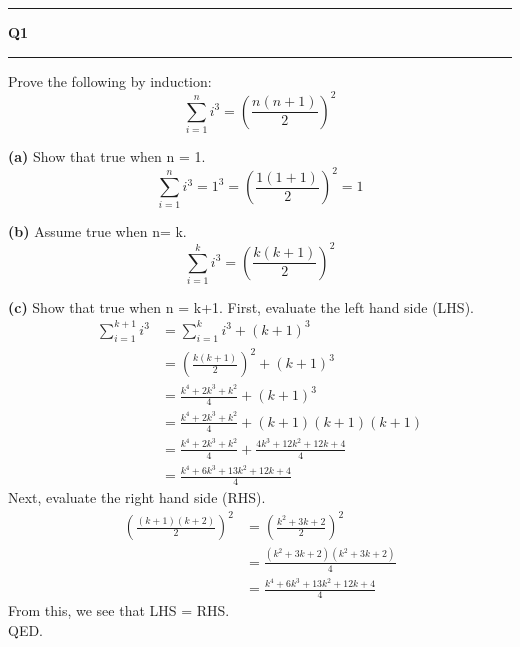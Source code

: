 \documentclass[11pt]{article}
\newcommand\question[2]{\vspace{.25in}\hrule\textbf{#1 #2}\vspace{.5em}\hrule\vspace{.10in}}
\renewcommand\part[1]{\vspace{.10in}\textbf{(#1)}}
\begin{document}
\raggedright
\newcommand\NAME{Sean Connor (443-414-5111)}  %
\newcommand\HWNUM{1}              %

\question{Q1}{}
Prove the following by induction:
\begin{equation*}
\sum_{i=1}^{n} i^3 = \left(\frac{n(n+1)}{2}\right)^2
\end{equation*}

\part{a} Show that true when n = 1.
\begin{equation*}
\sum_{i=1}^{n} i^3 = 1^3 = \left(\frac{1(1+1)}{2}\right)^2 = 1
\end{equation*}

\part{b} Assume true when n= k.
\begin{equation*}
\sum_{i=1}^{k} i^3 = \left(\frac{k(k+1)}{2}\right)^2
\end{equation*}

\part{c} Show that true when n = k+1.
\newline
\newline
First, evaluate the left hand side (LHS).
\begin{align*}
\sum_{i=1}^{k+1} i^3 & = \sum_{i=1}^{k} i^3 + (k+1)^3 \\
& = \left(\frac{k(k+1)}{2}\right)^2 + (k+1)^3 \\
& = \frac{k^4 + 2k^3 + k^2}{4} + (k+1)^3 \\
& = \frac{k^4 + 2k^3 + k^2}{4} + (k+1)(k+1)(k+1) \\
& = \frac{k^4 + 2k^3 + k^2}{4} + \frac{4k^3 + 12k^2 + 12k + 4}{4} \\
& = \frac{k^4 + 6k^3 + 13k^2 + 12k + 4}{4}
\end{align*}
Next, evaluate the right hand side (RHS).
\begin{align*}
\left(\frac{(k+1)(k+2)}{2}\right)^2 &= \left(\frac{k^2 + 3k + 2}{2}\right)^2 \\
& = \frac{(k^2+3k+2)(k^2+3k+2)}{4} \\
& = \frac{k^4 + 6k^3 + 13k^2 + 12k + 4}{4}
\end{align*}
From this, we see that LHS = RHS. \\
QED. \\
\vspace{8mm}
\end{document}
